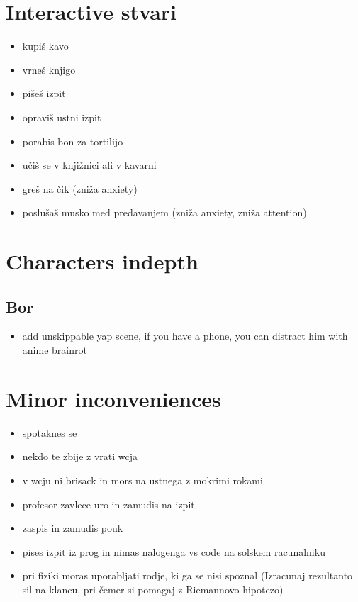 \documentclass[a4paper]{article}
\begin{document}
\section{Interactive stvari}
\begin{itemize}
    \item kupiš kavo
    \item vrneš knjigo
    \item pišeš izpit
    \item opraviš ustni izpit
    \item porabis bon za tortilijo
    \item učiš se v knjižnici ali v kavarni
    \item greš na čik (zniža anxiety)
    \item poslušaš musko med predavanjem (zniža anxiety, zniža attention)
\end{itemize}

\section{Characters indepth}
\subsection*{Bor}
\begin{itemize}
    \item add unskippable yap scene, if you have a phone, you can distract him with anime brainrot
\end{itemize}

\section{Minor inconveniences}
\begin{itemize}
    \item spotaknes se
    \item nekdo te zbije z vrati wcja
    \item v wcju ni brisack in mors na ustnega z mokrimi rokami
    \item profesor zavlece uro in zamudis na izpit
    \item zaspis in zamudis pouk
    \item pises izpit iz prog in nimas nalogenga vs code na solskem racunalniku
    \item pri fiziki moras uporabljati rodje, ki ga se nisi spoznal (Izracunaj rezultanto sil na klancu, pri čemer si pomagaj z Riemannovo hipotezo)
\end{itemize}
\end{document}
